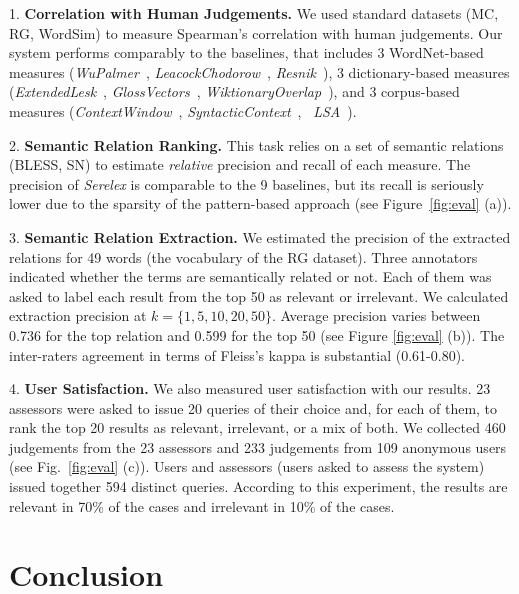 \documentclass[runningheads,a4paper]{llncs}
\begin{document}
1. \textbf{Correlation with Human Judgements.} We used standard datasets (MC, RG, WordSim) to  measure Spearman's correlation with human judgements. Our system performs comparably to the baselines, that includes 3 WordNet-based measures (\textit{WuPalmer}~\cite{wu1994verbs}, \textit{LeacockChodorow}~\cite{leacock1998}, \textit{Resnik}~\cite{resnik1995}), 3 dictionary-based measures (\textit{ExtendedLesk}~\cite{banerjee2003extended}, \textit{GlossVectors}~\cite{patwardhan2006using}, \textit{WiktionaryOverlap}~\cite{zesch2008extracting}), and 3 corpus-based measures (\textit{ContextWindow}~\cite{cruys2010mining}, \textit{SyntacticContext}~\cite{cruys2010mining}, ~\textit{LSA}~\cite{cruys2010mining}).

2. \textbf{Semantic Relation Ranking.} This task relies on a set of semantic relations (BLESS,  SN) to estimate \textit{relative} precision and recall of each measure. The precision of \textit{Serelex}  is comparable to the 9 baselines, but its recall is seriously lower due to the sparsity of the pattern-based approach (see Figure~\ref{fig:eval} (a)). 

3. \textbf{Semantic Relation Extraction.} We estimated the precision of the extracted relations for 49 words (the vocabulary of the RG dataset). Three annotators indicated whether the terms are semantically related or not. Each of them was asked to label each result from the top 50 as relevant or irrelevant. We calculated extraction precision at $k = \{1, 5, 10, 20, 50\}$. Average precision varies between 0.736 for the top relation and 0.599 for the top 50 (see Figure \ref{fig:eval} (b)). The inter-raters agreement in terms of Fleiss's kappa is substantial (0.61-0.80).

4. \textbf{User Satisfaction.} We also measured user satisfaction with our results. 23 assessors were asked to issue 20 queries of their choice and, for each of them, to rank the top 20 results as relevant, irrelevant, or a mix of both. We collected 460 judgements from the 23 assessors and 233 judgements from 109 anonymous users (see Fig.~\ref{fig:eval} (c)). Users and assessors (users asked to assess the system) issued together 594 distinct queries. According to this experiment, the results are relevant in 70\% of the cases and irrelevant in 10\% of the cases. %

\section{Conclusion}
\end{document}
